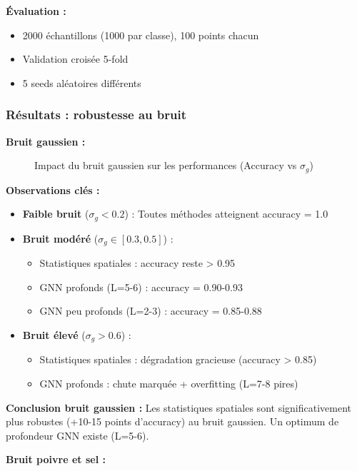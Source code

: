 \textbf{Évaluation :}
\begin{itemize}
    \item 2000 échantillons (1000 par classe), 100 points chacun
    \item Validation croisée 5-fold
    \item 5 seeds aléatoires différents
\end{itemize}

\subsubsection{Résultats : robustesse au bruit}

\textbf{Bruit gaussien :}

\begin{figure}[h]
  \centering
\caption{Impact du bruit gaussien sur les performances (Accuracy vs $\sigma_g$)}
\label{fig:noise_gaussian}
\end{figure}

\textbf{Observations clés :}
\begin{itemize}
    \item \textbf{Faible bruit} ($\sigma_g < 0.2$) : Toutes méthodes atteignent accuracy = 1.0
    \item \textbf{Bruit modéré} ($\sigma_g \in [0.3, 0.5]$) : 
        \begin{itemize}
            \item Statistiques spatiales : accuracy reste > 0.95
            \item GNN profonds (L=5-6) : accuracy = 0.90-0.93
            \item GNN peu profonds (L=2-3) : accuracy = 0.85-0.88
        \end{itemize}
    \item \textbf{Bruit élevé} ($\sigma_g > 0.6$) :
        \begin{itemize}
            \item Statistiques spatiales : dégradation gracieuse (accuracy > 0.85)
            \item GNN profonds : chute marquée + overfitting (L=7-8 pires)
        \end{itemize}
\end{itemize}

\textbf{Conclusion bruit gaussien :} Les statistiques spatiales sont significativement plus robustes (+10-15 points d'accuracy) au bruit gaussien. Un optimum de profondeur GNN existe (L=5-6).

\textbf{Bruit poivre et sel :}


